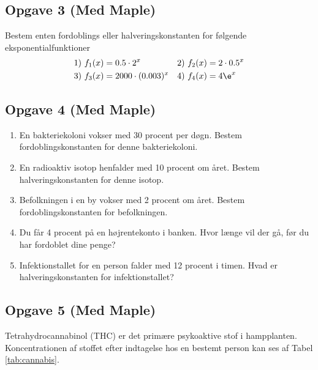 \subsection*{Opgave 3 (Med Maple)}
Bestem enten fordoblings eller halveringskonstanten for følgende eksponentialfunktioner
\begin{align*}
&1) \ f_1(x) = 0.5\cdot 2^x   &&2) \ f_2(x)=2\cdot 0.5^x  \\
&3) \ f_3(x) = 2000\cdot(0.003)^x  &&4) \ f_4(x) = 4\e^x  \\
\end{align*}

\subsection*{Opgave 4 (Med Maple)}

\begin{enumerate}[label=\roman*)]
	\item En bakteriekoloni vokser med 30 procent per døgn. Bestem fordoblingskonstanten for denne bakteriekoloni.
	\item En radioaktiv isotop henfalder med 10 procent om året. Bestem halveringskonstanten for denne isotop.
	\item Befolkningen i en by vokser med 2 procent om året. Bestem fordoblingskonstanten for befolkningen. 
	\item Du får 4 procent på en højrentekonto i banken. Hvor længe vil der gå, før du har fordoblet dine penge?
	\item Infektionstallet for en person falder med 12 procent i timen. Hvad er halveringskonstanten for infektionstallet?
\end{enumerate}
\newpage
\subsection*{Opgave 5 (Med Maple)}
Tetrahydrocannabinol (THC) er det primære psykoaktive stof i hampplanten. Koncentrationen af stoffet efter indtagelse hos en bestemt person kan ses af Tabel \ref{tab:cannabis}.

